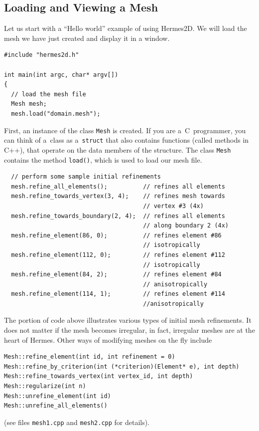 \documentclass[11pt]{article}
\begin{document}
\subsection{Loading and Viewing a Mesh}

Let us start with a ``Hello world'' example of using Hermes2D. We will load the mesh
we have just created and display it in a window.

\lstset{language=C++}
\begin{lstlisting}
#include "hermes2d.h"

int main(int argc, char* argv[])
{
  // load the mesh file
  Mesh mesh;
  mesh.load("domain.mesh");
\end{lstlisting}

First, an instance of the class {\tt Mesh} is created. If you are
a~C~programmer, you can think of a~class as a~{\tt struct} that also contains functions
(called methods in C++), that operate on the data members of the structure.
The class {\tt Mesh} contains the method {\tt load()}, which is used to load our mesh file.

\lstset{language=C++}
\begin{lstlisting}
  // perform some sample initial refinements
  mesh.refine_all_elements();          // refines all elements
  mesh.refine_towards_vertex(3, 4);    // refines mesh towards
                                       // vertex #3 (4x)
  mesh.refine_towards_boundary(2, 4);  // refines all elements
                                       // along boundary 2 (4x)
  mesh.refine_element(86, 0);          // refines element #86
                                       // isotropically
  mesh.refine_element(112, 0);         // refines element #112
                                       // isotropically
  mesh.refine_element(84, 2);          // refines element #84
                                       // anisotropically
  mesh.refine_element(114, 1);         // refines element #114
                                       //anisotropically
\end{lstlisting}

The portion of code above illustrates various types of initial mesh refinements.
It does not matter if the mesh becomes irregular, in fact, irregular
meshes are at the heart of Hermes.
Other ways of modifying meshes on the fly include
\begin{verbatim}
Mesh::refine_element(int id, int refinement = 0)
Mesh::refine_by_criterion(int (*criterion)(Element* e), int depth)
Mesh::refine_towards_vertex(int vertex_id, int depth)
Mesh::regularize(int n)
Mesh::unrefine_element(int id)
Mesh::unrefine_all_elements()
\end{verbatim}
(see files {\tt mesh1.cpp} and {\tt mesh2.cpp} for details).
\end{document}
